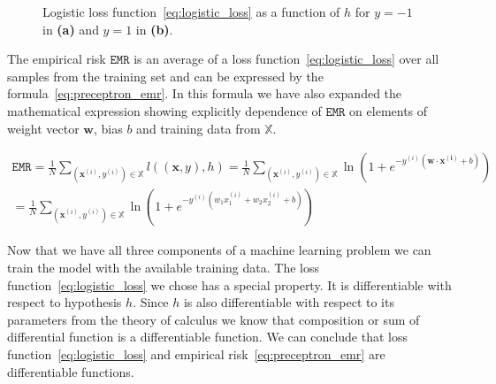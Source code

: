 \documentclass[english, 12pt, a4paper, elec, utf8, online]{aaltothesis}
\begin{document}
\usetikzlibrary{datavisualization}
\usetikzlibrary{datavisualization.formats.functions}
\begin{figure}[h!]
\centering
{}

\caption{Logistic loss function~\ref{eq:logistic_loss} as a function of $h$  for $y=-1$ in \textbf{(a)} and $y=1$ in \textbf{(b)}.}\label{fig:logistic_loss}
\end{figure}

The empirical risk $\mathtt{EMR}$ is an average of a loss function~\ref{eq:logistic_loss} over all samples from the training set and can be expressed by the formula~\ref{eq:preceptron_emr}. In this formula we have also expanded the mathematical expression showing explicitly dependence of $\mathtt{EMR}$ on elements of weight vector $\mathbf{w}$, bias $b$ and training data from $\mathbb{X}$.

\begin{align}\label{eq:preceptron_emr}
\mathtt{EMR} = \frac{1}{N}\sum_{(\mathbf{x}^{(i)}, y^{(i)}) \in \mathbb{X}}{l((\mathbf{x},y),h)} = \frac{1}{N}\sum_{(\mathbf{x}^{(i)}, y^{(i)}) \in \mathbb{X}}{\ln(1+e^{-y^{(i)} ( \mathbf{w} \cdot \mathbf{x^{(i)}} + b) })} \\= \frac{1}{N}\sum_{(\mathbf{x}^{(i)}, y^{(i)}) \in \mathbb{X}}{\ln(1+e^{-y^{(i)} ( w_1 x_{1}^{(i)} + w_2 x_{2}^{(i)} + b) })}
\end{align}

Now that we have all three components of a machine learning problem we can train the model with the available training data. The loss function~\ref{eq:logistic_loss} we chose has a special property. It is differentiable with respect to hypothesis $h$. Since $h$ is also differentiable with respect to its parameters from the theory of calculus we know that composition or sum of differential function is a differentiable function. We can conclude that loss function~\ref{eq:logistic_loss} and empirical risk~\ref{eq:preceptron_emr} are differentiable functions.                  
\end{document}
